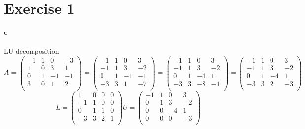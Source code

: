 
\section{Exercise 1}
\paragraph{c}

LU decomposition
\begin{equation*}
A = \left( \begin{array}{cccc}
-1 & 1 & 0 & -3\\
1 & 0 & 3 & 1\\
0 & 1 & -1 & -1\\
3 & 0 & 1 & 2\\
\end{array} \right) 
=
\left( \begin{array}{cccc}
-1 & 1 & 0 & 3\\
-1 & 1 & 3 & -2\\
0 & 1 & -1 & -1 \\
-3 & 3 & 1 & -7\\
\end{array} \right)
=
\left( \begin{array}{cccc}
-1 & 1 & 0 & 3\\
-1 & 1 & 3 & -2\\
0 & 1 & -4 & 1 \\
-3 & 3 & -8 & -1\\
\end{array} \right)
=
\left( \begin{array}{cccc}
-1 & 1 & 0 & 3\\
-1 & 1 & 3 & -2\\
0 & 1 & -4 & 1 \\
-3 & 3 & 2 & -3\\
\end{array} \right)
\end{equation*}
\begin{equation}
L = \left( \begin{array}{cccc}
1 & 0 & 0 & 0\\
-1 & 1 & 0 & 0\\
0 & 1 & 1 & 0 \\
-3 & 3 & 2 & 1\\
\end{array} \right)
U = \left( \begin{array}{cccc}
-1 & 1 & 0 & 3\\
0 & 1 & 3 & -2\\
0 & 0 & -4 & 1 \\
0 & 0 & 0 & -3\\
\end{array} \right)
\end{equation}

